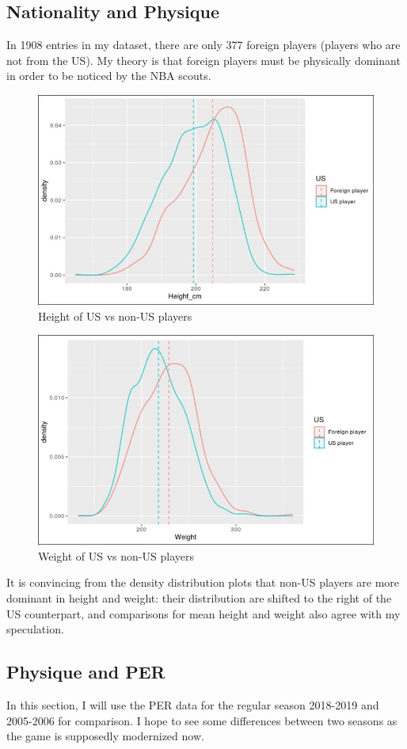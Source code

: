 \documentclass[a4paper,12pt,twoside]{article}
\numberwithin{equation}{section}
\begin{document}
\subsection{Nationality and Physique}
In 1908 entries in my dataset, there are only 377 foreign players (players who are not from the US). My theory is that foreign players must be physically dominant in order to be noticed by the NBA scouts. 

\begin{figure}[h]
\caption{Height of US vs non-US players}
\includegraphics[scale=0.33]{fush.jpg}
\centering
\end{figure}

\begin{figure}[h]
\caption{Weight of US vs non-US players}
\includegraphics[scale=0.33]{fusw.jpg}
\centering
\end{figure}

It is convincing from the density distribution plots that non-US players are more dominant in height and weight: their distribution are shifted to the right of the US counterpart, and comparisons for mean height and weight also agree with my speculation.

\subsection{Physique and PER}
In this section, I will use the PER data for the
 regular season 2018-2019 and 2005-2006 for comparison. I hope to see some differences between two seasons as the game is supposedly modernized now.


\end{document}
